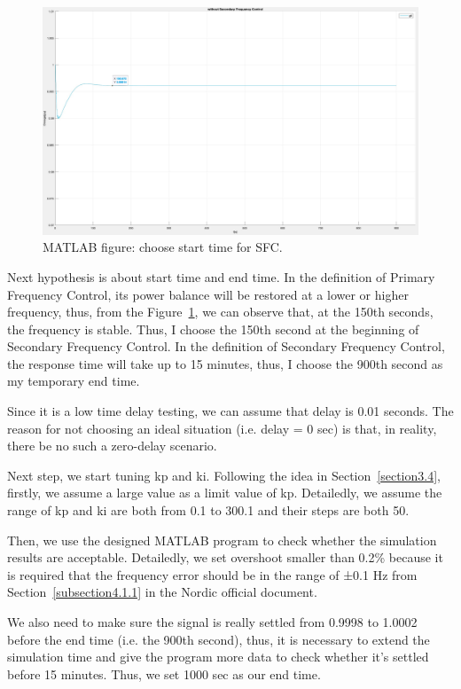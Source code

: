 \begin{figure}[htbp]
\centering
\includegraphics[width = .891\textwidth]{figure/4_1_1_without3.jpeg}
\caption{MATLAB figure: choose start time for SFC.}
\label{4_1_1_without3}
\end{figure}
Next hypothesis is about start time and end time. In the definition of Primary Frequency Control, its power balance will be restored at a lower or higher frequency, thus, from the Figure~\ref{4_1_1_without3}, we can observe that, at the 150th seconds, the frequency is stable. Thus, I choose the 150th second at the beginning of Secondary Frequency Control. In the definition of Secondary Frequency Control, the response time will take up to 15 minutes, thus, I choose the 900th second as my temporary end time. 

Since it is a low time delay testing, we can assume that delay is 0.01 seconds. The reason for not choosing an ideal situation (i.e. delay = 0 sec) is that, in reality, there be no such a zero-delay scenario. 

Next step, we start tuning kp and ki. Following the idea in Section~\ref{section3.4}, firstly, we assume a large value as a limit value of kp. Detailedly, we assume the range of kp and ki are both from 0.1 to 300.1 and their steps are both 50.  

Then, we use the designed MATLAB program to check whether the simulation results are acceptable. Detailedly, we set overshoot smaller than 0.2\% because it is required that the frequency error should be in the range of ±0.1 Hz from Section~\ref{subsection4.1.1} in the Nordic official document. 

We also need to make sure the signal is really settled from 0.9998 to 1.0002 before the end time (i.e. the 900th second), thus, it is necessary to extend the simulation time and give the program more data to check whether it's settled before 15 minutes. Thus, we set 1000 sec as our end time.

